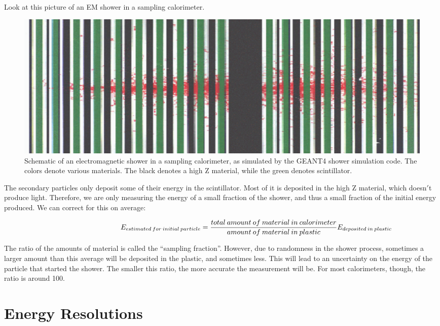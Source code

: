 \noindent
Look at this picture of an EM shower in a sampling calorimeter.


\;
\;

\begin{figure}[h]
\centering\includegraphics[scale=0.5]{./calorimetry/Pictures/fig6.pdf}
\caption{Schematic of an electromagnetic shower in a sampling calorimeter, as simulated by the GEANT4 shower simulation code. The colors denote various materials. The black denotes a high Z material, while the green denotes scintillator.}
\label{fig:pdgdedx}
\end{figure}

\;

\noindent
The secondary particles only deposit some of their energy in the scintillator.  Most of it is deposited in the high Z material, which doesn$'$t produce light. Therefore, we are only measuring the energy of a small fraction of the shower, and thus a small fraction of the initial energy produced. We can correct for this on average:

\begin{equation}\hspace{34 mm}E_{estimated \: for \: initial\:  particle} = \frac{total \:amount\:  of\:  material \: in \: calorimeter}{amount \: of \: material\:  in \: plastic} E_{deposited \: in \: plastic}\end{equation}

\;
\;

\noindent
The ratio of the amounts of material is called the ``sampling fraction''. However, due to randomness in the shower process, sometimes a larger amount than this average will be deposited in the plastic, and sometimes less. This will lead to an uncertainty on the energy of the particle that started the shower. The smaller this ratio, the more accurate the measurement will be. For most calorimeters, though, the ratio is around 100.

\section{Energy Resolutions}

